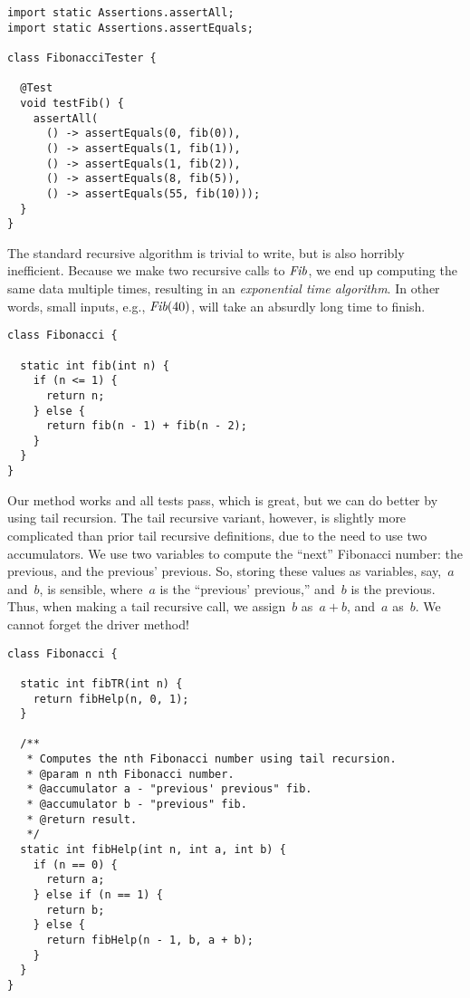 \enlargethispage{\baselineskip}
\begin{lstlisting}[language=MyJava]
import static Assertions.assertAll;
import static Assertions.assertEquals;

class FibonacciTester {

  @Test
  void testFib() {
    assertAll(
      () -> assertEquals(0, fib(0)),
      () -> assertEquals(1, fib(1)),
      () -> assertEquals(1, fib(2)),
      () -> assertEquals(8, fib(5)),
      () -> assertEquals(55, fib(10)));
  }
}
\end{lstlisting}

The standard recursive algorithm is trivial to write, but is also horribly inefficient. 
Because we make two recursive calls to $\emph{Fib}$, we end up computing the same data multiple times, resulting in an \emph{exponential time algorithm}. 
In other words, small inputs, e.g., $\emph{Fib}(40)$, will take an absurdly long time to finish.

\begin{lstlisting}[language=MyJava]
class Fibonacci {

  static int fib(int n) {
    if (n <= 1) { 
      return n; 
    } else { 
      return fib(n - 1) + fib(n - 2); 
    }
  }
}
\end{lstlisting}

Our method works and all tests pass, which is great, but we can do better by using tail recursion. 
The tail recursive variant, however, is slightly more complicated than prior tail recursive definitions, due to the need to use two accumulators. 
We use two variables to compute the ``next'' Fibonacci number: the previous, and the previous' previous. 
So, storing these values as variables, say,~$a$ and~$b$, is sensible, where~$a$ is the ``previous' previous,'' and~$b$ is the previous. 
Thus, when making a tail recursive call, we assign~$b$ as~$a + b$, and~$a$ as~$b$. 
We cannot forget the driver method!

\enlargethispage{2\baselineskip}
\begin{lstlisting}[language=MyJava]
class Fibonacci {

  static int fibTR(int n) {
    return fibHelp(n, 0, 1);
  }

  /**
   * Computes the nth Fibonacci number using tail recursion.
   * @param n nth Fibonacci number.
   * @accumulator a - "previous' previous" fib.
   * @accumulator b - "previous" fib.
   * @return result.
   */
  static int fibHelp(int n, int a, int b) {
    if (n == 0) {
      return a;
    } else if (n == 1) {
      return b;
    } else {
      return fibHelp(n - 1, b, a + b);
    }
  }
}
\end{lstlisting}

